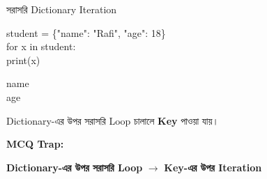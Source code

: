 

\begin{codeoutputbox}{সরাসরি Dictionary Iteration}

\noindent
\begin{minipage}[t]{0.55\linewidth}
\codeheading

\begin{english}
\ttfamily
student = \{"name": "Rafi", "age": 18\}\\
for x in student:\\
\hspace*{4mm}print(x)
\end{english}

\end{minipage}
\hfill
\begin{minipage}[t]{0.41\linewidth}
\outputheading

\begin{english}
\ttfamily
name\\
age
\end{english}

\medskip

Dictionary-এর উপর সরাসরি Loop চালালে
\textbf{Key} পাওয়া যায়।

\end{minipage}

\end{codeoutputbox}

\begin{rememberbox}

\textbf{\color{deepOrange}MCQ Trap:}

\begin{center}

\textbf{Dictionary-এর উপর সরাসরি Loop}
\(\longrightarrow\)
\textbf{Key-এর উপর Iteration}

\end{center}

\end{rememberbox}



